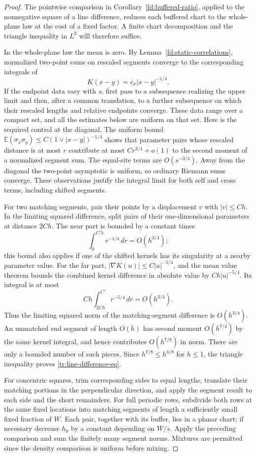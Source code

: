 \begin{proof}
The pointwise comparison in Corollary~\ref{fd:buffered-ratio}, applied to
the nonnegative square of a line difference, reduces each buffered chart
to the whole-plane law at the cost of a fixed factor. A finite chart
decomposition and the triangle inequality in $L^2$ will therefore suffice.

In the whole-plane law the mean is zero. By
Lemma~\ref{fd:static-correlations}, normalized two-point sums on
rescaled segments converge to the corresponding integrals of
\[
 K(x-y)=c_\sigma |x-y|^{-1/4}.
\]
If the endpoint data vary with $s$, first pass to a subsequence realizing
the upper limit and then, after a common translation, to a further
subsequence on which their rescaled lengths and relative endpoints
converge. These data range over a compact set, and all the estimates
below are uniform on that set.
Here is the required control at the diagonal. The uniform bound
$\mathbb E(\sigma_x\sigma_y)\leq C(1\vee|x-y|)^{-1/4}$ shows that
parameter pairs whose rescaled distance is at most $r$ contribute at
most $Cr^{3/4}+o(1)$ to the second moment of a normalized segment sum.
The equal-site terms are $O(s^{-3/4})$. Away from the diagonal the
two-point asymptotic is uniform, so ordinary Riemann sums converge.
These observations justify the integral limit for both self and cross
terms, including shifted segments.

For two matching segments, pair their points by a displacement $v$ with
$|v|\leq Ch$. In the limiting squared difference, split pairs of their
one-dimensional parameters at distance $2Ch$. The near part is bounded
by a constant times
\[
 \int_0^{C'h} r^{-1/4}\,dr=O(h^{3/4});
\]
this bound also applies if one of the shifted kernels has its singularity
at a nearby parameter value. For the far part,
$|\nabla K(u)|\leq C|u|^{-5/4}$, and the mean value theorem bounds the
combined kernel difference in absolute value by $Ch|u|^{-5/4}$.
Its integral is at most
\[
 Ch\int_{2Ch}^{C'}r^{-5/4}\,dr=O(h^{3/4}).
\]
Thus the limiting squared norm of the matching-segment difference is
$O(h^{3/4})$. An unmatched end segment of length $O(h)$ has second
moment $O(h^{7/4})$ by the same kernel integral, and hence contributes
$O(h^{7/8})$ in norm. There are only a bounded number of such pieces.
Since $h^{7/8}\leq h^{3/8}$ for $h\leq1$, the triangle inequality proves
\eqref{tr:line-difference-eq}.

For concentric squares, trim corresponding sides to equal lengths,
translate their matching portions in the perpendicular direction, and
apply the segment result to each side and the short remainders.
For full periodic rows, subdivide both rows at the same fixed locations
into matching segments of length a sufficiently small fixed fraction of
$W$. Each pair, together with its buffer, lies in a planar chart; if
necessary decrease $h_0$ by a constant depending on $W/s$. Apply the
preceding comparison and sum the finitely many segment norms. Mixtures
are permitted since the density comparison is uniform before mixing.
\end{proof}

